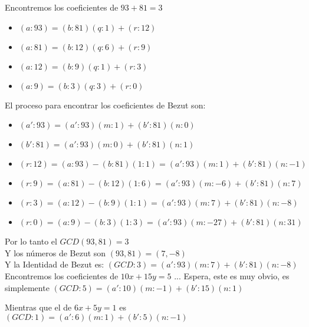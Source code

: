 \documentclass[12pt, fleqn]{article}                             %
\begin{document}
            \clearpage



            Encontremos los coeficientes de $93 + 81 = 3$
            \begin{itemize}
                \item $(a:93) = (b:81)(q:1) + (r:12)$
                \item $(a:81) = (b:12)(q:6) + (r:9)$
                \item $(a:12) = (b:9)(q:1) + (r:3)$
                \item $(a:9) = (b:3)(q:3) + (r:0)$     
            \end{itemize}

            El proceso para encontrar los coeficientes de Bezut son:

            \begin{itemize}
                \item $(a':93) = (a':93)(m:1) + (b':81)(n:0)$
                \item $(b':81) = (a':93)(m:0) + (b':81)(n:1)$ 
            \end{itemize}

            \begin{itemize}
                \item $(r:12) = (a:93) - (b:81)(1:1)  =  (a':93)(m:1) + (b':81)(n:-1)$
                \item $(r:9) = (a:81) - (b:12)(1:6)  =  (a':93)(m:-6) + (b':81)(n:7) $
                \item $(r:3) = (a:12) - (b:9)(1:1)  =  (a':93)(m:7) + (b':81)(n:-8)  $
                \item $(r:0) = (a:9) - (b:3)(1:3)  =  (a':93)(m:-27) + (b':81)(n:31) $
            \end{itemize}

            Por lo tanto el $GCD(93, 81) = 3$\\
            Y los números de Bezut son $(93, 81) = (7, -8)$\\                       
            Y la Identidad de Bezut es: $(GCD:3) = (a':93)(m:7) +(b':81)(n:-8)$\\




            Encontremos los coeficientes de $10x + 15y = 5$
            ... Espera, este es muy obvio, es simplemente
            $(GCD:5) = (a':10)(m:-1) +(b':15)(n:1)$

            Mientras que el de $6x + 5y = 1$ es $(GCD:1) = (a':6)(m:1) +(b':5)(n:-1)$
\end{document}
